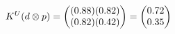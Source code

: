 \documentclass[preview]{standalone}
\begin{document}
\begin{align*}
\special{dvisvgm:raw <g id='unique000'>}K^U(d \otimes p) = \begin{pmatrix} (0.88)(0.82) \\ (0.82)(0.42) \end{pmatrix} = \begin{pmatrix} 0.72 \\ 0.35 \end{pmatrix}\special{dvisvgm:raw </g>}
\end{align*}
\end{document}
